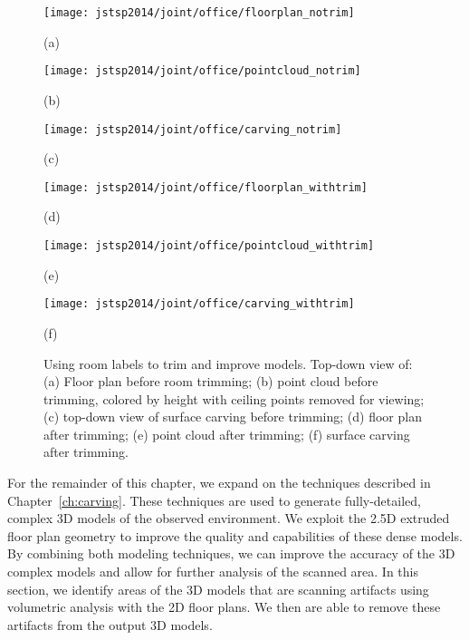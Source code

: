 \documentclass[12pt,onecolumn,oneside]{book}
\begin{document}
\begin{figure}[b!]

	\centering

	\begin{minipage}[t]{0.32\linewidth} %
		\centerline{\texttt{[image: jstsp2014/joint/office/floorplan\_notrim]}}
		\centerline{(a)}\medskip
	\end{minipage}
	\hfill
	\begin{minipage}[t]{0.32\linewidth} %
		\centerline{\texttt{[image: jstsp2014/joint/office/pointcloud\_notrim]}}
		\centerline{(b)}\medskip
	\end{minipage}
	\hfill
	\begin{minipage}[t]{0.32\linewidth} %
		\centerline{\texttt{[image: jstsp2014/joint/office/carving\_notrim]}}
		\centerline{(c)}\medskip
	\end{minipage}

	\begin{minipage}[t]{0.32\linewidth} %
		\centerline{\texttt{[image: jstsp2014/joint/office/floorplan\_withtrim]}}
		\centerline{(d)}\medskip
	\end{minipage}
	\hfill
	\begin{minipage}[t]{0.32\linewidth} %
		\centerline{\texttt{[image: jstsp2014/joint/office/pointcloud\_withtrim]}}
		\centerline{(e)}\medskip
	\end{minipage}
	\hfill
	\begin{minipage}[t]{0.32\linewidth} %
		\centerline{\texttt{[image: jstsp2014/joint/office/carving\_withtrim]}}
		\centerline{(f)}\medskip
	\end{minipage}
	
	\caption[Using room labels to trim and improve models.]{Using room labels to trim and improve models.  Top-down view of: (a) Floor plan before room trimming; (b) point cloud before trimming, colored by height with ceiling points removed for viewing; (c) top-down view of surface carving before trimming; (d) floor plan after trimming; (e) point cloud after trimming; (f) surface carving after trimming.}
	\label{fig:explosion_trimming}

\end{figure}

For the remainder of this chapter, we expand on the techniques described in Chapter~\ref{ch:carving}.  These techniques are used to generate fully-detailed, complex 3D models of the observed environment.  We exploit the 2.5D extruded floor plan geometry to improve the quality and capabilities of these dense models.  By combining both modeling techniques, we can improve the accuracy of the 3D complex models and allow for further analysis of the scanned area.  In this section, we identify areas of the 3D models that are scanning artifacts using volumetric analysis with the 2D floor plans.  We then are able to remove these artifacts from the output 3D models.
\end{document}
